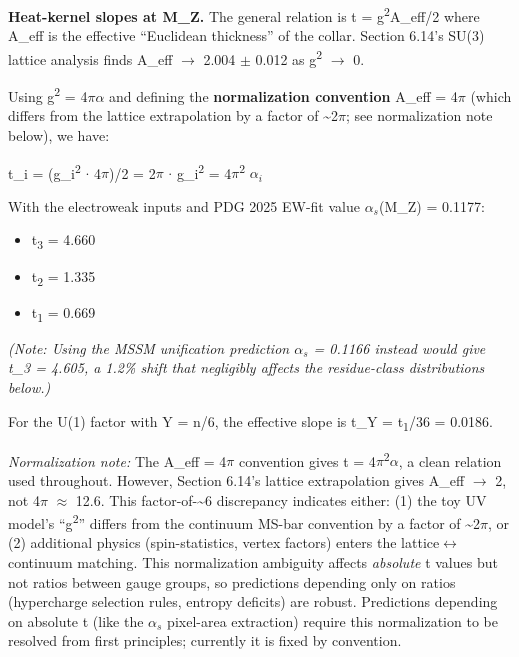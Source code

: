 \documentclass[11pt,a4paper]{article}
\theoremstyle{remark}
\providecommand{\tightlist}{%
  \setlength{\itemsep}{0pt}\setlength{\parskip}{0pt}}
\begin{document}
\textbf{Heat-kernel slopes at M\_Z.} The general relation is t = g\textsuperscript{2}A\_eff/2 where
A\_eff is the effective ``Euclidean thickness'' of the collar. Section 6.14's
SU(3) lattice analysis finds A\_eff \ensuremath{\to} 2.004 \ensuremath{\pm} 0.012 as g\textsuperscript{2} \ensuremath{\to} 0.

Using g\textsuperscript{2} = 4\ensuremath{\pi}\ensuremath{\alpha} and defining the \textbf{normalization convention} A\_eff = 4\ensuremath{\pi}
(which differs from the lattice extrapolation by a factor of \textasciitilde2\ensuremath{\pi}; see
normalization note below), we have:

t\_i = (g\_i\textsuperscript{2} \ensuremath{\cdot} 4\ensuremath{\pi})/2 = 2\ensuremath{\pi} \ensuremath{\cdot} g\_i\textsuperscript{2} = 4\ensuremath{\pi}\textsuperscript{2} \(\alpha_i\)

With the electroweak inputs and PDG 2025 EW-fit value \(\alpha_s\)(M\_Z) = 0.1177:

\begin{itemize}
\tightlist
\item
  t\textsubscript{3} = 4.660
\item
  t\textsubscript{2} = 1.335
\item
  t\textsubscript{1} = 0.669
\end{itemize}

\emph{(Note: Using the MSSM unification prediction \(\alpha_s\) = 0.1166 instead would give
t\_3 = 4.605, a 1.2\% shift that negligibly affects the residue-class distributions
below.)}

For the U(1) factor with Y = n/6, the effective slope is t\_Y = t\textsubscript{1}/36 = 0.0186.

\emph{Normalization note:} The A\_eff = 4\ensuremath{\pi} convention gives t = 4\ensuremath{\pi}\textsuperscript{2}\ensuremath{\alpha}, a clean
relation used throughout. However, Section 6.14's lattice extrapolation
gives A\_eff \ensuremath{\to} 2, not 4\ensuremath{\pi} \ensuremath{\approx} 12.6. This factor-of-\textasciitilde6 discrepancy indicates
either: (1) the toy UV model's ``g\textsuperscript{2}'' differs from the continuum MS-bar
convention by a factor of \textasciitilde2\ensuremath{\pi}, or (2) additional physics (spin-statistics,
vertex factors) enters the lattice\ensuremath{\leftrightarrow}continuum matching. This normalization
ambiguity affects \emph{absolute} t values but not ratios between gauge groups,
so predictions depending only on ratios (hypercharge selection rules,
entropy deficits) are robust. Predictions depending on absolute t (like
the \(\alpha_s\) pixel-area extraction) require this normalization to be resolved
from first principles; currently it is fixed by convention.
\end{document}
